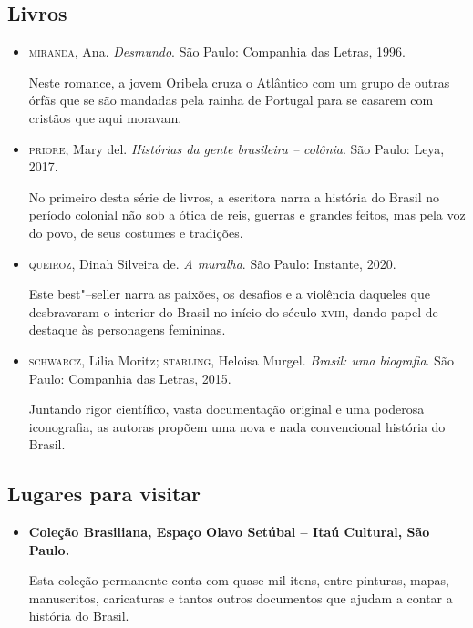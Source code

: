 \documentclass[12pt]{extarticle}
\begin{document}
{\begin{itemize}
	\end{itemize}

\subsection{Livros}

\begin{itemize}
\item\textsc{miranda}, Ana. \textit{Desmundo}. São Paulo: Companhia das Letras, 1996.

Neste romance, a jovem Oribela cruza o Atlântico com um grupo de outras
órfãs que se são mandadas pela rainha de Portugal para se casarem com
cristãos que aqui moravam.

\item\textsc{priore}, Mary del. \textit{Histórias da gente brasileira -- colônia}. São Paulo: Leya, 2017.

No primeiro desta série de livros, a escritora narra a história do
Brasil no período colonial não sob a ótica de reis, guerras e grandes
feitos, mas pela voz do povo, de seus costumes e tradições.

\item\textsc{queiroz}, Dinah Silveira de. \textit{A muralha}. São Paulo: Instante,
2020.

Este best"--seller narra as paixões, os desafios e a violência daqueles
que desbravaram o interior do Brasil no início do século \textsc{xviii}, dando
papel de destaque às personagens femininas.

\item\textsc{schwarcz}, Lilia Moritz; \textsc{starling}, Heloisa Murgel. \textit{Brasil: uma biografia}. São Paulo: Companhia das Letras, 2015.

Juntando rigor científico, vasta documentação original e uma poderosa
iconografia, as autoras propõem uma nova e nada convencional história do
Brasil.
\end{itemize}

\subsection{Lugares para visitar}

\begin{itemize}
\item\textbf{Coleção Brasiliana, Espaço Olavo Setúbal -- Itaú Cultural, São Paulo.}

Esta coleção permanente conta com quase mil itens, entre pinturas,
mapas, manuscritos, caricaturas e tantos outros documentos que ajudam a
contar a história do Brasil.
\end{itemize}

}
\end{document}
